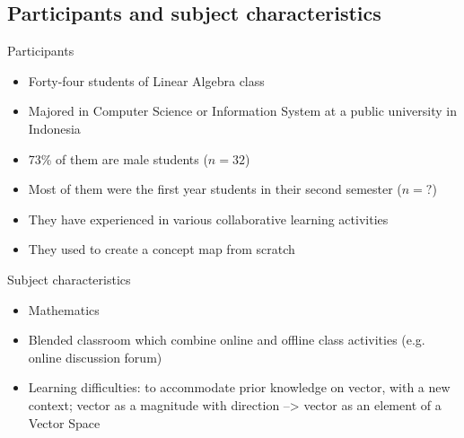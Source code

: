 \subsection{Participants and subject characteristics}




\begin{frame}{Participants}

\begin{itemize}
    \item Forty-four students of Linear Algebra class
    \item Majored in Computer Science or Information System at a public university in Indonesia
    \item 73\% of them are male students ($n = 32$)
    \item Most of them were the first year students in their second semester 
         ($n=?$)
    \item They have experienced in various collaborative learning activities
    \item They used to create a concept map from scratch
\end{itemize}

\end{frame}

\begin{frame}{Subject characteristics}

\begin{itemize}
    \item Mathematics
    \item Blended classroom which combine online and offline class activities 
          (e.g. online discussion forum)
    \item Learning difficulties: to accommodate prior knowledge on vector,
          with a new context; vector as a magnitude with direction --> 
          vector as an element of a Vector Space
\end{itemize}
    
\end{frame}


